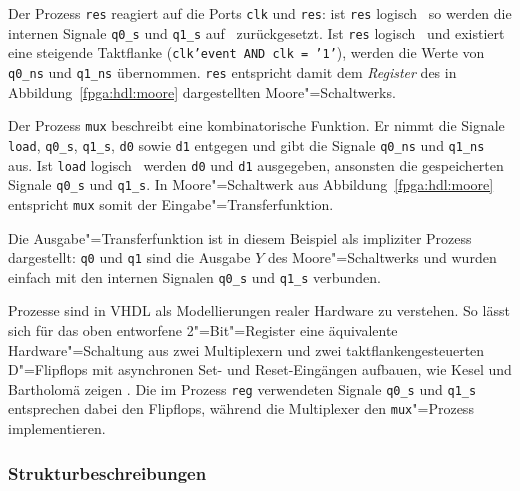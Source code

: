 Der Prozess \texttt{res} reagiert auf die Ports \texttt{clk} und \texttt{res}:
ist \texttt{res} logisch \grqq\, so werden die internen Signale
\texttt{q0\_s} und \texttt{q1\_s} auf \grqq\ zurückgesetzt. Ist
\texttt{res} logisch \grqq\ und existiert eine steigende Taktflanke
(\texttt{clk'event AND clk = '1'}), werden die Werte von \texttt{q0\_ns} und
\texttt{q1\_ns} übernommen. \texttt{res} entspricht damit dem \textit{Register}
des in Abbildung~\ref{fpga:hdl:moore} dargestellten Moore"=Schaltwerks.
\cite[vgl.][30--31]{kesel2013}

Der Prozess \texttt{mux} beschreibt eine kombinatorische Funktion. Er
nimmt die Signale \texttt{load}, \texttt{q0\_s}, \texttt{q1\_s},
\texttt{d0} sowie \texttt{d1} entgegen und gibt die Signale \texttt{q0\_ns} und
\texttt{q1\_ns} aus. Ist \texttt{load} logisch \grqq\, werden \texttt{d0}
und \texttt{d1} ausgegeben, ansonsten die gespeicherten Signale \texttt{q0\_s}
und \texttt{q1\_s}. In Moore"=Schaltwerk aus Abbildung~\ref{fpga:hdl:moore}
entspricht \texttt{mux} somit der Eingabe"=Transferfunktion.
\cite[vgl.][31]{kesel2013}

Die Ausgabe"=Transferfunktion ist in diesem Beispiel als impliziter Prozess
dargestellt: \texttt{q0} und \texttt{q1} sind die Ausgabe $Y$ des
Moore"=Schaltwerks und wurden einfach mit den internen Signalen \texttt{q0\_s}
und \texttt{q1\_s} verbunden.
\cite[vgl.][31]{kesel2013}

Prozesse sind in VHDL als Modellierungen realer Hardware zu verstehen. So lässt
sich für das oben entworfene 2"=Bit"=Register eine äquivalente
Hardware"=Schaltung aus zwei Multiplexern und zwei taktflankengesteuerten
D"=Flipflops mit asynchronen Set- und Reset-Eingängen aufbauen, wie Kesel und
Bartholomä zeigen \cite[siehe][32]{kesel2013}. Die im Prozess \texttt{reg}
verwendeten Signale \texttt{q0\_s} und \texttt{q1\_s} entsprechen dabei den
Flipflops, während die Multiplexer den \texttt{mux}"=Prozess implementieren.
\cite[vgl.][31]{kesel2013}

\subsubsection{Strukturbeschreibungen}

